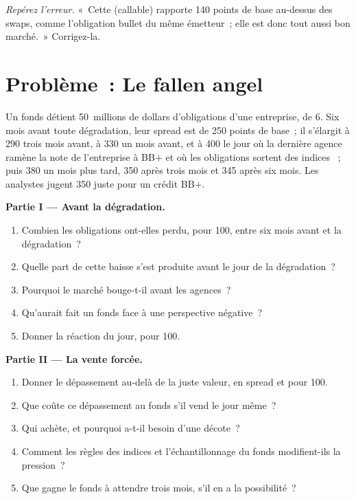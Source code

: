 \begin{exercise}[$\star\star\star$]\label{exo:m2:corporate-bonds:8}
\emph{Repérez l'erreur.} «~Cette  (callable) rapporte 140 points de base au-dessus des swaps, 
comme l'obligation bullet du même émetteur~; elle est donc tout aussi bon marché.~» Corrigez-la.
\end{exercise}

\section{Problème~: Le fallen angel}

\begin{problem}\label{pb:m2:corporate-bonds:1}
Un fonds détient 50~millions de dollars d'obligations d'une entreprise, de  6. Six mois
avant toute dégradation, leur spread est de 250 points de base~; il s'élargit à 290 trois mois
avant, à 330 un mois avant, et à 400 le jour où la dernière agence ramène la note de l'entreprise à
BB$+$ et où les obligations sortent des indices ~; puis 380 un mois plus tard, 350
après trois mois et 345 après six mois. Les analystes jugent 350 juste pour un crédit BB$+$.

\medskip\noindent\textbf{Partie I --- Avant la dégradation.}
\begin{enumerate}
\item Combien les obligations ont-elles perdu, pour 100, entre six mois avant et la dégradation~?
\item Quelle part de cette baisse s'est produite avant le jour de la dégradation~?
\item Pourquoi le marché bouge-t-il avant les agences~?
\item Qu'aurait fait un fonds  face à une perspective négative~?
\item Donner la réaction du jour, pour 100.
\end{enumerate}

\medskip\noindent\textbf{Partie II --- La vente forcée.}
\begin{enumerate}[resume]
\item Donner le dépassement au-delà de la juste valeur, en spread et pour 100.
\item Que coûte ce dépassement au fonds s'il vend le jour même~?
\item Qui achète, et pourquoi a-t-il besoin d'une décote~?
\item Comment les règles des indices et l'échantillonnage du fonds modifient-ils la pression~?
\item Que gagne le fonds à attendre trois mois, s'il en a la possibilité~?
\end{enumerate}


\end{problem}
